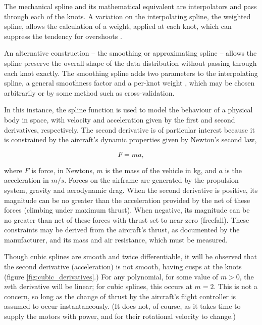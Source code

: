 \documentclass[doc]{apa6}
\begin{document}
The mechanical spline and its mathematical equivalent are interpolators and pass through each of the knots. A variation on the interpolating spline, the weighted spline, allows the calculation of a weight, applied at each knot, which can suppress the tendency for overshoots \parencite{lancaster1986curve}.

An alternative construction -- the smoothing or approximating spline -- allows the spline preserve the overall shape of the data distribution without passing through each knot exactly. The smoothing spline adds two parameters to the interpolating spline, a general smoothness factor and a per-knot weight \parencite{lancaster1986curve,deBoor1980}, which may be chosen arbitrarily or by some method such as cross-validation.

In this instance, the spline function is used to model the behaviour of a physical body in space, with velocity and acceleration given by the first and second derivatives, respectively. The second derivative is of particular interest because it is constrained by the aircraft's dynamic properties given by Newton's second law,

\begin{equation}
F = ma,
\end{equation} 

where $F$ is force, in Newtons, $m$ is the mass of the vehicle in kg, and $a$ is the acceleration in $m/s$. Forces on the airframe are generated by the propulsion system, gravity and aerodynamic drag. When the second derivative is positive, its magnitude can be no greater than the acceleration provided by the net of these forces (climbing under maximum thrust). When negative, its magnitude can be no greater than net of these forces with thrust set to near zero (freefall). These constraints may be derived from the aircraft's thrust, as documented by the manufacturer, and its mass and air resistance, which must be measured. 

Though cubic splines are smooth and twice differentiable, it will be observed that the second derivative (acceleration) is not smooth, having cusps at the knots (figure \ref{fig:cubic_derivatives}.) For any polynomial, for some value of $m > 0$, the $m$th derivative will be linear; for cubic splines, this occurs at $m = 2$. This is not a concern, so long as the change of thrust by the aircraft's flight controller is assumed to occur instantaneously. (It does not, of course, as it takes time to supply the motors with power, and for their rotational velocity to change.) 
\end{document}
